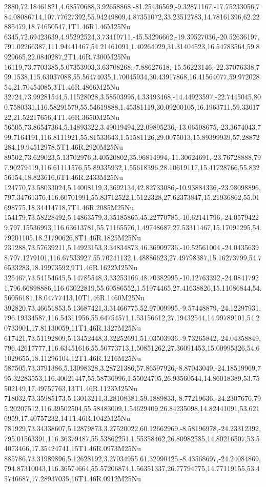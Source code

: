 2880,72.18461821,4.68570688,3.92658868,-81.25436569,-9.32871167,-17.75233056,784.08086714,107.77627392,55.94249809,4.87351072,33.23512783,14.78161396,62.22885479,18.74650547,1T1.46R1.46M25Nu
6345,72.69423639,4.95292524,3.73419711,-45.53296662,-19.39527036,-20.52636197,791.02266387,111.94441467,54.21461091,1.40264029,31.31404523,16.54783564,59.8929665,22.0840287,2T1.46R.7300M25Nu
16119,73.7703385,5.07353903,3.63708268,-7.88627618,-15.56223146,-22.37076338,799.1538,115.63037088,55.56474035,1.70045934,30.43917868,16.41564077,59.97202854,21.70454085,3T1.46R.4866M25Nu
32724,73.99281544,5.11528028,3.58503995,4.33493468,-14.44923597,-22.7445045,800.7580331,116.58291579,55.54619888,1.45381119,30.09200105,16.1963711,59.3301722,21.52217656,4T1.46R.3650M25Nu
56505,73.86547364,5.14893322,3.49019494,22.09895236,-13.06508675,-23.3674043,799.7164191,116.8111921,55.81533643,1.51581126,29.0075013,15.89399939,57.28872284,19.94512978,5T1.46R.2920M25Nu
89502,73.629023,5.13702976,3.40520802,35.96814994,-11.30624691,-23.76728888,797.90279419,116.61111576,55.89335932,1.55618396,28.10619117,15.41728766,55.83256154,18.823616,6T1.46R.2433M25Nu
124770,73.58033024,5.14008119,3.3692134,42.82733086,-10.93884336,-23.98098896,797.34761376,116.60701991,55.83712522,1.5122328,27.62373847,15.21936862,55.01698775,18.34414718,7T1.46R.2085M25Nu
154179,73.58228492,5.14863579,3.35185865,45.22770785,-10.62141796,-24.05794229,797.15536993,116.63613781,55.71165576,1.49748687,27.53311467,15.17091295,54.79201105,18.21790626,8T1.46R.1825M25Nu
231288,73.57639211,5.14923153,3.34834873,46.36909736,-10.52561004,-24.04356398,797.1279101,116.67533927,55.70241132,1.48886623,27.49798387,15.16273799,54.76533283,18.19973592,9T1.46R.1622M25Nu
325467,73.54154645,5.14785548,3.33253166,48.70382995,-10.12763392,-24.08417921,796.66898886,116.63022819,55.60586552,1.51974465,27.41638826,15.11086844,54.56056181,18.04777413,10T1.46R.1460M25Nu
392820,73.46651853,5.13687421,3.31466775,52.97009995,-9.57448879,-24.12297931,796.19334587,116.54311956,55.64754571,1.53156612,27.19432544,14.99789101,54.20733901,17.81130059,11T1.46R.1327M25Nu
617421,73.51192809,5.13452448,3.32252691,51.03503936,-9.73265842,-24.04358849,796.42617777,116.63451616,55.56773713,1.50851262,27.36091453,15.00995326,54.61029655,18.11296104,12T1.46R.1216M25Nu
587505,73.3791386,5.13098328,3.28721386,57.86597926,-8.87043049,-24.18519969,795.32283553,116.40021447,55.58736996,1.55024705,26.93560544,14.86018389,53.75502149,17.49757763,13T1.46R.1123M25Nu
718032,73.35985173,5.13013211,3.28108381,59.1889833,-8.77219636,-24.2307676,795.20207512,116.39502504,55.58483009,1.54629409,26.84235098,14.82441091,53.6216959,17.40757232,14T1.46R.1042M25Nu
781929,73.34338607,5.12879873,3.27520022,60.12662969,-8.58196978,-24.23312392,795.01563391,116.36379487,55.53862251,1.55358462,26.80982585,14.80216507,53.54073466,17.35424741,15T1.46R.0973M25Nu
885786,73.31989896,5.12628192,3.27034955,61.32990425,-8.43568697,-24.24084869,794.87310043,116.36574664,55.57206874,1.56351337,26.77794775,14.77119155,53.45746687,17.28937035,16T1.46R.0912M25Nu
